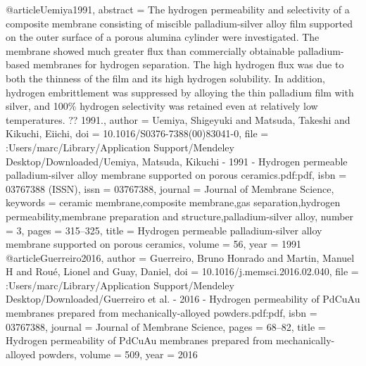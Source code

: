 @article{Uemiya1991,
abstract = {The hydrogen permeability and selectivity of a composite membrane consisting of miscible palladium-silver alloy film supported on the outer surface of a porous alumina cylinder were investigated. The membrane showed much greater flux than commercially obtainable palladium-based membranes for hydrogen separation. The high hydrogen flux was due to both the thinness of the film and its high hydrogen solubility. In addition, hydrogen embrittlement was suppressed by alloying the thin palladium film with silver, and 100{\%} hydrogen selectivity was retained even at relatively low temperatures. ?? 1991.},
author = {Uemiya, Shigeyuki and Matsuda, Takeshi and Kikuchi, Eiichi},
doi = {10.1016/S0376-7388(00)83041-0},
file = {:Users/marc/Library/Application Support/Mendeley Desktop/Downloaded/Uemiya, Matsuda, Kikuchi - 1991 - Hydrogen permeable palladium-silver alloy membrane supported on porous ceramics.pdf:pdf},
isbn = {03767388 (ISSN)},
issn = {03767388},
journal = {Journal of Membrane Science},
keywords = {ceramic membrane,composite membrane,gas separation,hydrogen permeability,membrane preparation and structure,palladium-silver alloy},
number = {3},
pages = {315--325},
title = {{Hydrogen permeable palladium-silver alloy membrane supported on porous ceramics}},
volume = {56},
year = {1991}
}
@article{Guerreiro2016,
author = {Guerreiro, Bruno Honrado and Martin, Manuel H and Rou{\'{e}}, Lionel and Guay, Daniel},
doi = {10.1016/j.memsci.2016.02.040},
file = {:Users/marc/Library/Application Support/Mendeley Desktop/Downloaded/Guerreiro et al. - 2016 - Hydrogen permeability of PdCuAu membranes prepared from mechanically-alloyed powders.pdf:pdf},
isbn = {03767388},
journal = {Journal of Membrane Science},
pages = {68--82},
title = {{Hydrogen permeability of PdCuAu membranes prepared from mechanically-alloyed powders}},
volume = {509},
year = {2016}
}
